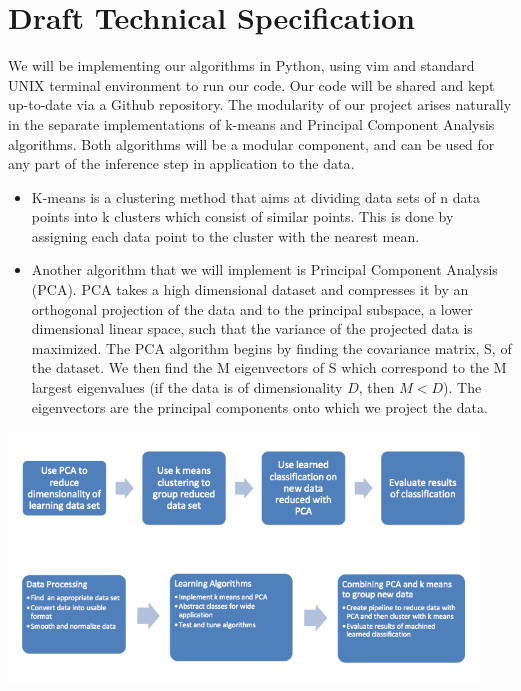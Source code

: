 \documentclass[12pt]{article} %
\begin{document}
\section{Draft Technical Specification}

We will be implementing our algorithms in Python, using vim and standard 
UNIX terminal environment to run our code. Our code will be shared and kept up-to-date via a Github repository. 
The modularity of our project arises naturally in the separate implementations of k-means and Principal Component Analysis algorithms. Both algorithms will be a modular component, and can be used for any part of the inference step in application to the data.   

\begin{itemize}
	\item K-means is a clustering method that aims at dividing data sets of n data points into  k clusters which consist of similar points. This is done by assigning each data point to the cluster with the nearest mean.

	\item Another algorithm that we will implement is Principal Component Analysis (PCA).  PCA takes a high dimensional dataset and compresses it by an orthogonal projection of the data and to the principal subspace, a lower dimensional linear space, such that the variance of the projected data is maximized.
The PCA algorithm begins by finding the covariance matrix, S, of the dataset.  We then find the M eigenvectors of S which correspond to the M largest eigenvalues (if the data is of dimensionality $D$, then $M < D$).  The eigenvectors are the principal components onto which we project the data.
\end{itemize}
\begin{center}
\includegraphics[width=125mm]{flowchart.png}
\end{center}
\end{document}
